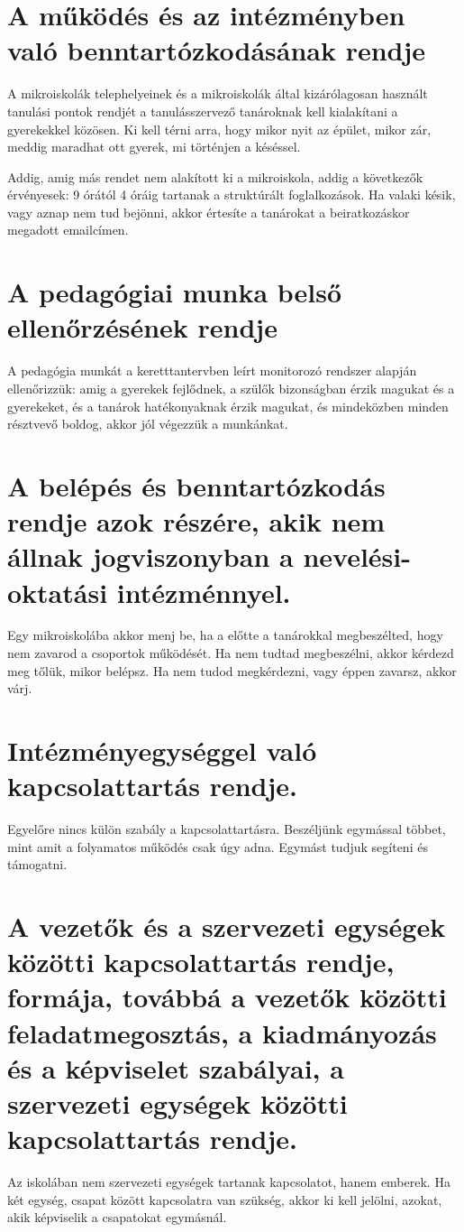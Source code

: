 

\section{A működés és az intézményben való benntartózkodásának rendje}
A mikroiskolák telephelyeinek és a mikroiskolák által kizárólagosan használt tanulási pontok rendjét a tanulásszervező tanároknak kell kialakítani a gyerekekkel közösen. Ki kell térni arra, hogy mikor nyit az épület, mikor zár, meddig maradhat ott gyerek, mi történjen a késéssel.

Addig, amig más rendet nem alakított ki a mikroiskola, addig a következők érvényesek: 9 órától 4 óráig tartanak a struktúrált foglalkozások. Ha valaki késik, vagy aznap nem tud bejönni, akkor értesíte a tanárokat a beiratkozáskor megadott emailcímen.

\section{A pedagógiai munka belső ellenőrzésének rendje}
A pedagógia munkát a keretttantervben leírt monitorozó rendszer alapján ellenőrizzük: amig a gyerekek fejlődnek, a szülők bizonságban érzik magukat és a gyerekeket, és a tanárok hatékonyaknak érzik magukat, és mindeközben minden résztvevő boldog, akkor jól végezzük a munkánkat.

\section{A belépés és benntartózkodás rendje azok részére, akik nem állnak jogviszonyban a nevelési-oktatási intézménnyel.}
Egy mikroiskolába akkor menj be, ha a előtte a tanárokkal megbeszélted, hogy nem zavarod a csoportok működését. Ha nem tudtad megbeszélni, akkor kérdezd meg tőlük, mikor belépsz. Ha nem tudod megkérdezni, vagy éppen zavarsz, akkor várj.


\section{Intézményegységgel való kapcsolattartás rendje.}
Egyelőre nincs külön szabály a kapcsolattartásra. Beszéljünk egymással többet, mint amit a folyamatos működés csak úgy adna. Egymást tudjuk segíteni és támogatni.



\section{A vezetők és a szervezeti egységek közötti kapcsolattartás rendje, formája, továbbá a vezetők közötti feladatmegosztás, a kiadmányozás és a képviselet szabályai, a szervezeti egységek közötti kapcsolattartás rendje.}
Az iskolában nem szervezeti egységek tartanak kapcsolatot, hanem emberek. Ha két egység, csapat között kapcsolatra van szükség, akkor ki kell jelölni, azokat, akik képviselik a csapatokat egymásnál.

